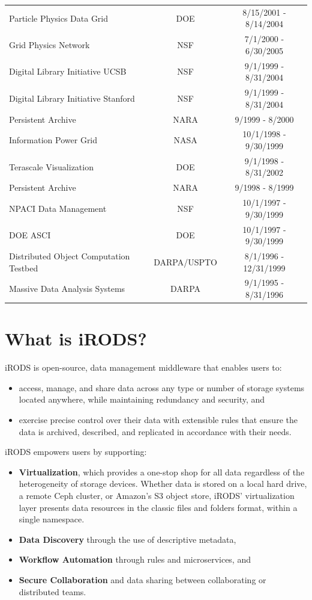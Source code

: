 \documentclass[10pt,oneside]{memoir}
\begin{document}
\begin{center}
\begin{tabular}{ |l|c|c| }
 Particle Physics Data Grid & DOE & 8/15/2001 - 8/14/2004 \\
 Grid Physics Network & NSF & 7/1/2000 - 6/30/2005 \\
 Digital Library Initiative UCSB & NSF & 9/1/1999 - 8/31/2004 \\
 Digital Library Initiative Stanford & NSF & 9/1/1999 - 8/31/2004 \\
 Persistent Archive & NARA & 9/1999 - 8/2000 \\
 Information Power Grid & NASA & 10/1/1998 - 9/30/1999 \\
 Terascale Visualization & DOE & 9/1/1998 - 8/31/2002 \\
 Persistent Archive & NARA & 9/1998 - 8/1999 \\
 NPACI Data Management & NSF & 10/1/1997 - 9/30/1999 \\
 DOE ASCI & DOE & 10/1/1997 - 9/30/1999 \\
 Distributed Object Computation Testbed & DARPA/USPTO & 8/1/1996 - 12/31/1999 \\
 Massive Data Analysis Systems & DARPA & 9/1/1995 - 8/31/1996 \\
 \hline
\end{tabular}
\end{center}


\newpage
\mainmatter


\chapter{What is iRODS?}

iRODS is open-source, data management middleware that enables users to:

\begin{itemize}
 \item access, manage, and share data across any type or number of storage systems located anywhere, while maintaining redundancy and security, and
 \item exercise precise control over their data with extensible rules that ensure the data is archived, described, and replicated in accordance with their needs.
\end{itemize}

iRODS empowers users by supporting:

\begin{itemize}
 \item \textbf{Virtualization}, which provides a one-stop shop for all data regardless of the heterogeneity of storage devices. Whether data is stored on a local hard drive, a remote Ceph cluster, or Amazon's S3 object store, iRODS' virtualization layer presents data resources in the classic files and folders format, within a single namespace.
 \item \textbf{Data Discovery} through the use of descriptive metadata,
 \item \textbf{Workflow Automation} through rules and microservices, and
 \item \textbf{Secure Collaboration} and data sharing between collaborating or distributed teams.
\end{itemize}
\end{document}
